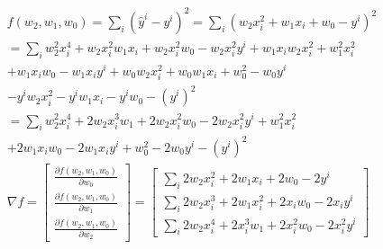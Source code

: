 \documentclass[en]{university}
\begin{document}
\setupdocument

\section{}

\subsection{}

\begin{gather*}
    f(w_2, w_1, w_0) = \sum_i (\hat{y}^i - y^i)^2 = \sum_i (w_2 x_i^2 + w_1 x_i + w_0 - y^i)^2 \\
    = \sum_i w_2^2 x_i^4 + w_2 x_i^2 w_1 x_i + w_2 x_i^2 w_0 - w_2 x_i^2 y^i + w_1 x_i w_2 x_i^2 + w_1^2 x_i^2 \\
    + w_1 x_i w_0 - w_1 x_i y^i + w_0 w_2 x_i^2 + w_0 w_1 x_i + w_0^2 - w_0 y^i \\
    - y^i w_2 x_i^2 - y^i w_1 x_i - y^i w_0 - (y^i)^2 \\
    = \sum_i w_2^2 x_i^4 + 2 w_2 x_i^3 w_1 + 2 w_2 x_i^2 w_0 - 2 w_2 x_i^2 y^i + w_1^2 x_i^2 \\
    + 2 w_1 x_i w_0 - 2 w_1 x_i y^i + w_0^2 - 2 w_0 y^i - (y^i)^2 \\
    \nabla f = \begin{bmatrix}
        \frac{\partial f(w_2, w_1, w_0)}{\partial w_0} \\
        \frac{\partial f(w_2, w_1, w_0)}{\partial w_1} \\
        \frac{\partial f(w_2, w_1, w_0)}{\partial w_2}
    \end{bmatrix} = \begin{bmatrix}
        \sum_i 2 w_2 x_i^2 + 2 w_1 x_i + 2 w_0 - 2 y^i \\
        \sum_i 2 w_2 x_i^3 + 2 w_1 x_i^2 + 2 x_i w_0 - 2 x_i y^i \\
        \sum_i 2 w_2 x_i^4 + 2 x_i^3 w_1 + 2 x_i^2 w_0 - 2 x_i^2 y^i
    \end{bmatrix}
\end{gather*}
\end{document}
